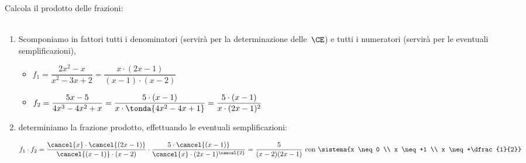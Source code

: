 \begin{esempio}{}{}
Calcola il prodotto delle frazioni: \\
\\ [-.5em]

\begin{enumerate} [left=0mm]
\item Scomponiamo in fattori tutti i denominatori (servirà per la 
determinazione delle~\(\CE\)) e
  tutti i numeratori (servirà per le eventuali semplificazioni),
\begin{itemize}%
\item \(f_1=\dfrac{2x^2-x}{x^2-3x+2}=
            \dfrac{x \cdot (2x-1)}{(x-1) \cdot (x-2)}\)
\item \(f_2=\dfrac{5x-5}{4x^3-4x^2+x}=
            \dfrac{5 \cdot (x-1)}{x \cdot \tonda{4x^2-4x+1}}=
            \dfrac{5 \cdot (x-1)}{x \cdot (2x-1)^2}\)
\end{itemize}
\item determiniamo la frazione prodotto, effettuando le eventuali 
semplificazioni:

\vspace{-2.0em}
\[f_1 \cdot f_2 = 
\dfrac{\cancel{x} \cdot \cancel{(2x-1)}}{\cancel{(x-1)} \cdot {(x-2)}} 
\cdot \dfrac{5\cdot\cancel{(x-1)}}{\cancel{x}\cdot(2x-1)^{\cancel{2}}}=
\dfrac{5}{(x-2)(2x-1)} \text{ con }
\sistema{x \neq 0 \\ x \neq +1 \\ x \neq +\dfrac{1}{2}}
\]

\end{enumerate}
\end{esempio}


